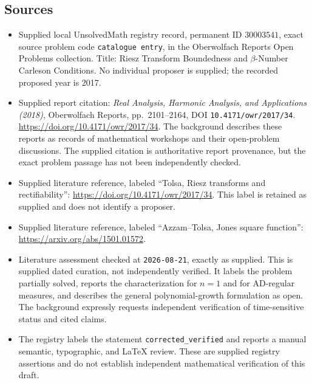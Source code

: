 \documentclass[11pt]{article}
\begin{document}
\subsection{Sources}
\begin{itemize}
\item Supplied local UnsolvedMath registry record, permanent ID \(30003541\), exact source problem code \texttt{catalogue entry}, in the Oberwolfach Reports Open Problems collection. Title: Riesz Transform Boundedness and \(\beta\)-Number Carleson Conditions. No individual proposer is supplied; the recorded proposed year is 2017.
\item Supplied report citation: \emph{Real Analysis, Harmonic Analysis, and Applications (2018)}, Oberwolfach Reports, pp.\ 2101--2164, DOI \texttt{10.4171/owr/2017/34}. \url{https://doi.org/10.4171/owr/2017/34}. The background describes these reports as records of mathematical workshops and their open-problem discussions. The supplied citation is authoritative report provenance, but the exact problem passage has not been independently checked.
\item Supplied literature reference, labeled ``Tolsa, Riesz transforms and rectifiability'': \url{https://doi.org/10.4171/owr/2017/34}. This label is retained as supplied and does not identify a proposer.
\item Supplied literature reference, labeled ``Azzam--Tolsa, Jones square function'': \url{https://arxiv.org/abs/1501.01572}.
\item Literature assessment checked at \texttt{2026-08-21}, exactly as supplied. This is supplied dated curation, not independently verified. It labels the problem partially solved, reports the characterization for \(n=1\) and for AD-regular measures, and describes the general polynomial-growth formulation as open. The background expressly requests independent verification of time-sensitive status and cited claims.
\item The registry labels the statement \texttt{corrected\_verified} and reports a manual semantic, typographic, and LaTeX review. These are supplied registry assertions and do not establish independent mathematical verification of this draft.
\end{itemize}
\end{document}
